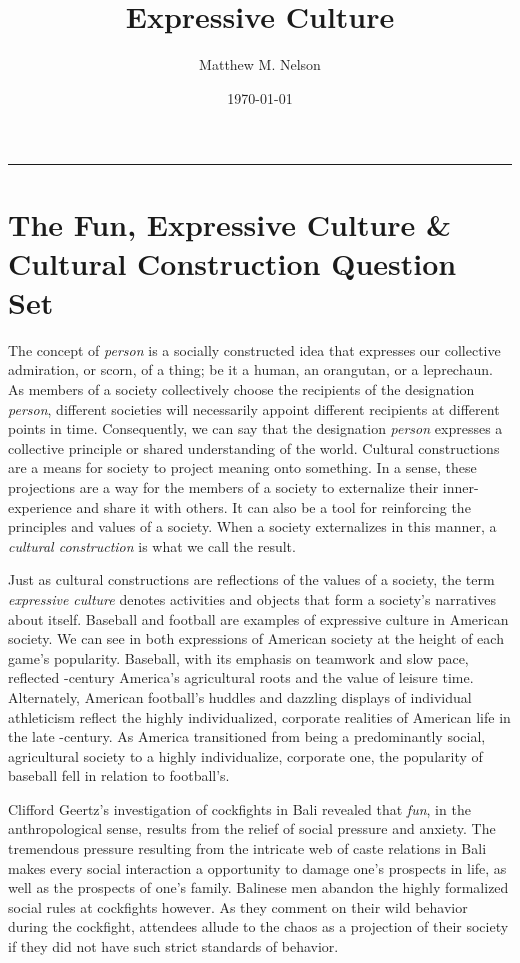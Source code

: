 \documentclass[12pt]{article}
\author{Matthew M. Nelson}
\date{\today}
\title{Expressive Culture}
\begin{document}
\maketitle

\noindent\rule{\textwidth}{0.5pt}
\section{The Fun, Expressive Culture \& Cultural Construction Question Set}
\label{sec:org0e35d50}

The concept of \emph{person} is a socially constructed idea that expresses our
collective admiration, or scorn, of a thing; be it a human, an orangutan, or a
leprechaun. As members of a society collectively choose the recipients of the
designation \emph{person}, different societies will necessarily appoint different
recipients at different points in time. Consequently, we can say that the
designation \emph{person} expresses a collective principle or shared understanding of
the world. Cultural constructions are a means for society to project meaning
onto something. In a sense, these projections are a way for the members of a
society to externalize their inner-experience and share it with others. It can
also be a tool for reinforcing the principles and values of a society. When a
society externalizes in this manner, a \emph{cultural construction} is what we call the
result.

Just as cultural constructions are reflections of the values of a society, the
term \emph{expressive culture} denotes activities and objects that form a society's
narratives about itself. Baseball and football are examples of expressive
culture in American society. We can see in both expressions of American society
at the height of each game's popularity. Baseball, with its emphasis on teamwork
and slow pace, reflected -century America's agricultural roots and the
value of leisure time. Alternately, American football's huddles and dazzling
displays of individual athleticism reflect the highly individualized, corporate
realities of American life in the late -century. As America transitioned
from being a predominantly social, agricultural society to a highly
individualize, corporate one, the popularity of baseball fell in relation to
football's.

Clifford Geertz's investigation of cockfights in Bali revealed that \emph{fun}, in the
anthropological sense, results from the relief of social pressure and anxiety.
The tremendous pressure resulting from the intricate web of caste relations in
Bali makes every social interaction a opportunity to damage one's prospects in
life, as well as the prospects of one's family. Balinese men abandon the highly
formalized social rules at cockfights however. As they comment on their wild
behavior during the cockfight, attendees allude to the chaos as a projection of
their society if they did not have such strict standards of behavior.
\end{document}
